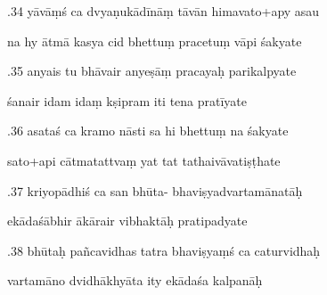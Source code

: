 \documentclass[article,12pt,a4paper]{memoir}%
\newcounter{parCount}
\begin{document}
	  
	  \pstart {}.34 yāvāṃś ca dvyaṇukādīnāṃ tāvān himavato+apy asau 
	{}
	\pend%
      

	  
	  \pstart \leavevmode%
	na hy ātmā kasya cid bhettuṃ pracetuṃ vāpi śakyate 
	{}
	\pend%
      

	  
	  \pstart {}.35 anyais tu bhāvair anyeṣāṃ pracayaḥ parikalpyate 
	{}
	\pend%
      

	  
	  \pstart \leavevmode%
	śanair idam idaṃ kṣipram iti tena pratīyate 
	{}
	\pend%
      

	  
	  \pstart {}.36 asataś ca kramo nāsti sa hi bhettuṃ na śakyate 
	{}
	\pend%
      

	  
	  \pstart \leavevmode%
	sato+api cātmatattvaṃ yat tat tathaivāvatiṣṭhate 
	{}
	\pend%
      

	  
	  \pstart {}.37 kriyopādhiś ca san bhūta-   bhaviṣyadvartamānatāḥ 
	{}
	\pend%
      

	  
	  \pstart \leavevmode%
	ekādaśābhir ākārair vibhaktāḥ pratipadyate 
	{}
	\pend%
      

	  
	  \pstart {}.38 bhūtaḥ pañcavidhas tatra bhaviṣyaṃś ca caturvidhaḥ 
	{}
	\pend%
      

	  
	  \pstart \leavevmode%
	vartamāno dvidhākhyāta ity ekādaśa kalpanāḥ 
	{}
	\pend%
      
\end{document}
